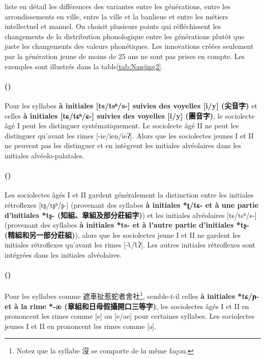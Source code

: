 \documentclass{scrbook}
\newcounter{c}[subsubsection]
\newcommand{\stpc}[1]{\stepcounter{#1}}
\newcommand{\illustre}{Les exemples sont illustrés dans la table\xspace}
\newcommand{\termyyx}[1]{\textbf{#1}}
\begin{document}
\begin{sloppypar}
\textcite[4--11]{Liu1995Nanjing} liste en détail les différences des variantes entre les générations, entre les arrondissements en ville, entre la ville et la banlieue et entre les métiers intellectuel et manuel. On choisit plusieurs points qui réfléchissent les changements de la distribution phonologique entre les générations plutôt que juste les changements des valeurs phonétiques. Les innovations créées seulement par la génération jeune de moins de 25 ans ne sont pas prises en compte. \illustre \ref{tab:Nanjing2}.

\stpc{c}\paragraph{()}
Pour les syllabes \termyyx{à initiales [ts/tsʰ/s-] suivies des voyelles [i/y] (尖音字)} et celles \termyyx{à initiales [tɕ/tɕʰ/ɕ-] suivies des voyelles [i/y] (團音字)}, le sociolecte âgé I peut les distinguer systématiquement. Le sociolecte âgé II ne peut les distinguer qu'avant les rimes [-ie/ien/ieʔ]. Alors que les sociolectes jeunes I et II ne peuvent pas les distinguer et en intègrent les initiales alvéolaires dans les initiales alvéolo-palatales.

\stpc{c}\paragraph{()}
Les sociolectes âgés I et II gardent généralement la distinction entre les initiales rétroflexes [tʂ/tʂʰ/ʂ-] (provenant des syllabes \termyyx{à initiales *ʈ/tɕ- et à une partie d'initiales *tʂ- (知組、章組及部分莊組字)}) et les initiales alvéolaires [ts/tsʰ/s-] (provenant des syllabes \termyyx{à initiales *ts- et à l'autre partie d'initiales *tʂ- (精組和另一部分莊組)}), alors que les sociolectes jeune I et II ne gardent les initiales rétroflexes qu'avant les rimes [-ʅ/ʅʔ]. Les autres initiales rétroflexes sont intégrées dans les initiales alvéolaires.

\stpc{c}\paragraph{()}
Pour les syllabes comme 遮車扯惹蛇者舍社\footnote{Notez que la syllabe 沒 se comporte de la même façon.}, semble-t-il celles \termyyx{à initiales *tɕ/ɲ- et à la rime *-æ (章組和日母假攝開口三等字)}, les sociolectes âgés I et II en prononcent les rimes comme [e] ou [e/ae] pour certaines syllabes. Les sociolectes jeunes I et II en prononcent les rimes comme [ə].


\end{sloppypar}
\end{document}
